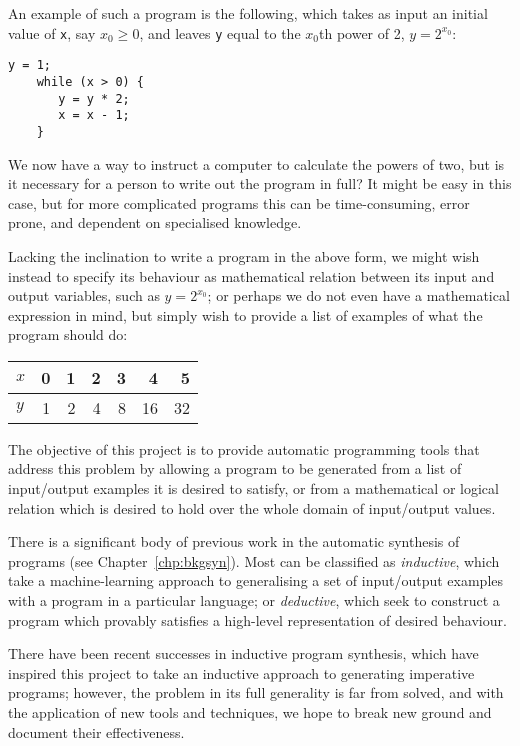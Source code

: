 \documentclass[a4paper,twoside,notitlepage]{report}
\begin{document}
An example of such a program is the following, which takes as input an initial 
value of \texttt{x}, say $x_0 \ge 0$, and leaves \texttt{y} equal to the 
$x_0$th power of 2, $y = 2^{x_0}$:
\begin{Verbatim}[samepage=true]
    y = 1;
    while (x > 0) {
       y = y * 2;
       x = x - 1;
    }
\end{Verbatim}

We now have a way to instruct a computer to calculate the powers of two, 
but is it necessary for a person to write out the program in full? It 
might be easy in this case, but for more complicated programs this can be 
time-consuming, error prone, and dependent on specialised knowledge.

Lacking the inclination to write a program in the above form, we might 
wish instead to specify its behaviour as mathematical relation between 
its input and output variables, such as $y = 2^{x_0}$; or perhaps we do not 
even have a mathematical expression in mind, but simply wish to provide a 
list of examples of what the program should do:
\begin{center}
\begin{tabular}{| l || r | r | r | r | r | r |}
    \hline
    $x$ & 0 & 1 & 2 & 3 & 4  &  5 \\
    \hline
    $y$ & 1 & 2 & 4 & 8 & 16 & 32 \\
    \hline
\end{tabular}
\end{center}

The objective of this project is to provide automatic programming tools 
that address this problem by allowing a program to be generated from a 
list of input/output examples it is desired to satisfy, or from a 
mathematical or logical relation which is desired to hold over the whole 
domain of input/output values.

There is a significant body of previous work in the automatic synthesis of 
programs (see Chapter~\ref{chp:bkgsyn}). Most can be classified as 
\emph{inductive}, which take a machine-learning approach to generalising a set 
of input/output examples with a program in a particular language; or 
\emph{deductive}\cite{cheatham86}\cite{bundy90}\cite{colon05}, which seek to 
construct a program which provably satisfies a high-level representation of 
desired behaviour.

There have been recent successes in inductive program synthesis\cite{tds}, 
which have inspired this project to take an inductive approach to generating 
imperative programs; however, the problem in its full generality is far from 
solved, and with the application of new tools and techniques, we hope to break 
new ground and document their effectiveness.
\end{document}
